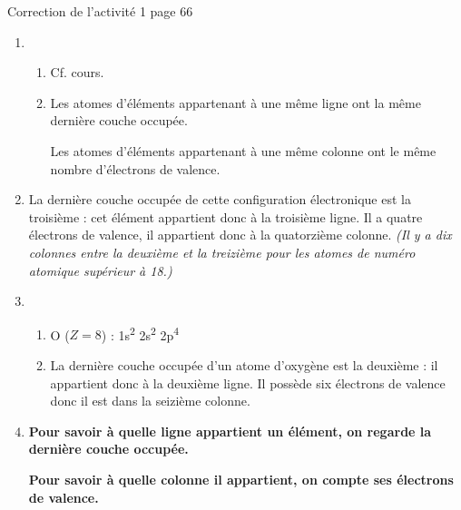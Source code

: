 \documentclass[12pt,a4paper,fleqn]{article}
\begin{document}
\begin{header}
Correction de l'activité 1 page 66
\end{header}

\begin{enumerate}
\item
\begin{enumerate}
\item Cf. cours.
\item
Les atomes d'éléments appartenant à une même ligne ont la même dernière couche occupée.

Les atomes d'éléments appartenant à une même colonne ont le même nombre d'électrons de valence.
\end{enumerate}

\item La dernière couche occupée de cette configuration électronique est la troisième : cet élément appartient donc à la troisième ligne.
Il a quatre électrons de valence, il appartient donc à la quatorzième colonne. 
\textit{(Il y a dix colonnes entre la deuxième et la treizième pour les atomes de numéro atomique supérieur à 18.)}

\item
\begin{enumerate}
\item O ($Z=8$) : 1s\textsuperscript{2} 2s\textsuperscript{2} 2p\textsuperscript{4}

\item La dernière couche occupée d'un atome d'oxygène est la deuxième : il appartient donc à la deuxième ligne.
Il possède six électrons de valence donc il est dans la seizième colonne.
\end{enumerate}

\item \textbf{Pour savoir à quelle ligne appartient un élément, on regarde la dernière couche occupée.}

\textbf{Pour savoir à quelle colonne il appartient, on compte ses électrons de valence.}
\end{enumerate}
\end{document}
